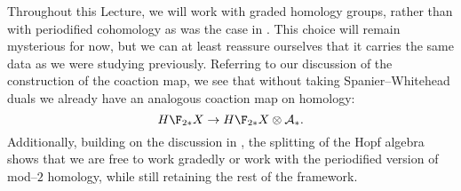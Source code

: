 \begin{remark}
Throughout this Lecture, we will work with graded homology groups, rather than with periodified cohomology as was the case in .  This choice will remain mysterious for now, but we can at least reassure ourselves that it carries the same data as we were studying previously.  Referring to our discussion of the construction of the coaction map, we see that without taking Spanier--Whitehead duals we already have an analogous coaction map on homology: \[H\F_{2*} X \to H\F_{2*} X \otimes \mathcal A_*.\]  Additionally, building on the discussion in , the splitting of the Hopf algebra shows that we are free to work gradedly or work with the periodified version of mod--$2$ homology, while still retaining the rest of the framework.
\end{remark}

